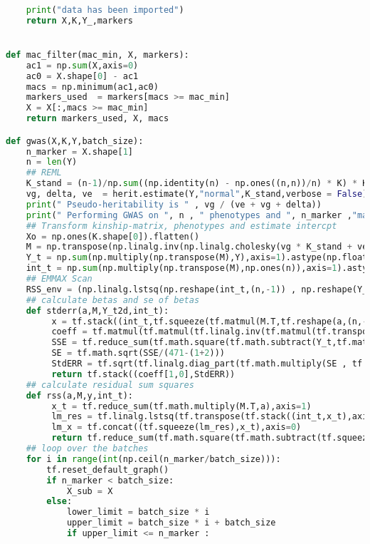 \begin{lstlisting}[language=Python]
       
    print("data has been imported")
    return X,K,Y_,markers


def mac_filter(mac_min, X, markers):
    ac1 = np.sum(X,axis=0)
    ac0 = X.shape[0] - ac1
    macs = np.minimum(ac1,ac0)
    markers_used  = markers[macs >= mac_min]
    X = X[:,macs >= mac_min]
    return markers_used, X, macs

def gwas(X,K,Y,batch_size):
    n_marker = X.shape[1]
    n = len(Y)
    ## REML   
    K_stand = (n-1)/np.sum((np.identity(n) - np.ones((n,n))/n) * K) * K
    vg, delta, ve  = herit.estimate(Y,"normal",K_stand,verbose = False)
    print(" Pseudo-heritability is " , vg / (ve + vg + delta))
    print(" Performing GWAS on ", n , " phenotypes and ", n_marker ,"markers")
    ## Transform kinship-matrix, phenotypes and estimate intercpt
    Xo = np.ones(K.shape[0]).flatten()
    M = np.transpose(np.linalg.inv(np.linalg.cholesky(vg * K_stand + ve  * np.identity(n)))).astype(np.float32)
    Y_t = np.sum(np.multiply(np.transpose(M),Y),axis=1).astype(np.float32)
    int_t = np.sum(np.multiply(np.transpose(M),np.ones(n)),axis=1).astype(np.float32)
    ## EMMAX Scan
    RSS_env = (np.linalg.lstsq(np.reshape(int_t,(n,-1)) , np.reshape(Y_t,(n,-1)))[1]).astype(np.float32)
    ## calculate betas and se of betas 
    def stderr(a,M,Y_t2d,int_t):
         x = tf.stack((int_t,tf.squeeze(tf.matmul(M.T,tf.reshape(a,(n,-1))))),axis=1)
         coeff = tf.matmul(tf.matmul(tf.linalg.inv(tf.matmul(tf.transpose(x),x)),tf.transpose(x)),Y_t2d)
         SSE = tf.reduce_sum(tf.math.square(tf.math.subtract(Y_t,tf.math.add(tf.math.multiply(x[:,1],coeff[0,0]),tf.math.multiply(x[:,1],coeff[1,0])))))
         SE = tf.math.sqrt(SSE/(471-(1+2)))
         StdERR = tf.sqrt(tf.linalg.diag_part(tf.math.multiply(SE , tf.linalg.inv(tf.matmul(tf.transpose(x),x)))))[1]
         return tf.stack((coeff[1,0],StdERR))
    ## calculate residual sum squares 
    def rss(a,M,y,int_t):
         x_t = tf.reduce_sum(tf.math.multiply(M.T,a),axis=1)
         lm_res = tf.linalg.lstsq(tf.transpose(tf.stack((int_t,x_t),axis=0)),Y_t2d)
         lm_x = tf.concat((tf.squeeze(lm_res),x_t),axis=0)
         return tf.reduce_sum(tf.math.square(tf.math.subtract(tf.squeeze(Y_t2d),tf.math.add(tf.math.multiply(lm_x[1],lm_x[2:]), tf.multiply(lm_x[0],int_t)))))
    ## loop over the batches 
    for i in range(int(np.ceil(n_marker/batch_size))):
        tf.reset_default_graph()
        if n_marker < batch_size:
            X_sub = X
        else:
            lower_limit = batch_size * i 
            upper_limit = batch_size * i + batch_size
            if upper_limit <= n_marker :

\end{lstlisting}
